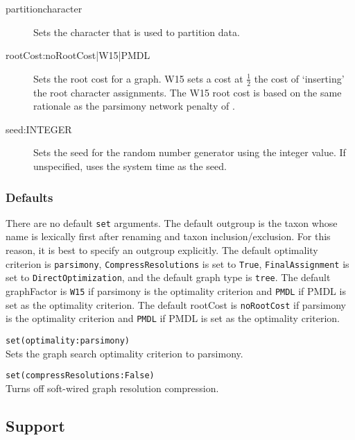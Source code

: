 \begin{description}
			\item[partitioncharacter] Sets the character that is used to partition data.
			
			\item[rootCost:noRootCost|W15|PMDL] Sets the root cost for a graph. W15 sets a 
			cost at $\frac{1}{2}$ the cost of `inserting' the root character assignments. 
			The W15 root cost is based on the same rationale as the parsimony network penalty of
			 \cite{Wheeler2015}.
			 
			 \item[seed:INTEGER] Sets the seed for the random number generator using the integer
			 value. If unspecified, \phyg uses the system time as the seed.
		\end{description}
					
	\subsubsection{Defaults} 
		There are no default \texttt{set} arguments. The default outgroup is the taxon whose name is 
		lexically first after renaming and taxon inclusion/exclusion. For this reason, it is best to specify 
		an outgroup explicitly. The default optimality criterion is \texttt{parsimony}, \texttt{CompressResolutions} 
		is set to \texttt{True}, \texttt{FinalAssignment} is set to \texttt{DirectOptimization}, and the default 
		graph type is \texttt{tree}. The default graphFactor is \texttt{W15} if parsimony is the optimality 
		criterion and \texttt{PMDL} if PMDL is set as the optimality criterion. The default rootCost
		is \texttt{noRootCost} if parsimony is the optimality criterion and \texttt{PMDL} if PMDL is set 
		as the optimality criterion.
		
	\begin{example}
		\item{\texttt{set(optimality:parsimony)}\\Sets the graph search optimality criterion to parsimony.}
						
		\item{\texttt{set(compressResolutions:False)}\\Turns off soft-wired graph resolution compression.}
	\end{example}

\subsection{Support}
